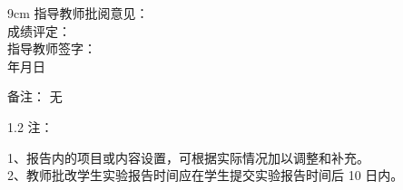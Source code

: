 \documentclass[12pt, a4paper]{article}
\begin{document}
\begin{labbox}{}{9cm}
    \hspace{1em}指导教师批阅意见：\\[3.5cm]
    \hspace{1em}成绩评定：\\[2cm]
    \hfill 指导教师签字：\hspace{4em} \\
    \hfill \makebox[3em]{}年\makebox[2em]{}月\makebox[2em]{}日\hspace{2em} \\[0.5em]
\end{labbox}

\begin{labbox}{备注：}{}
    无
\end{labbox}

\begin{spacing}{1.2}
    \noindent 注：\begin{minipage}[t]{0.88\textwidth}
        1、报告内的项目或内容设置，可根据实际情况加以调整和补充。\\
        2、教师批改学生实验报告时间应在学生提交实验报告时间后 10 日内。
    \end{minipage}
\end{spacing}
\end{document}
